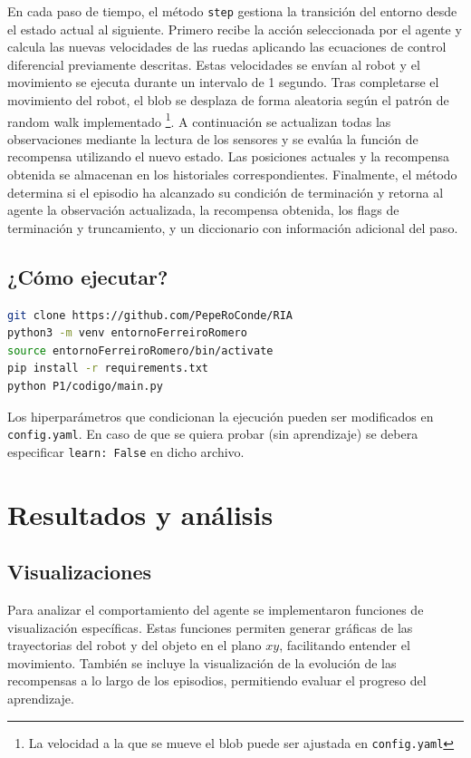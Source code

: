 \documentclass[12pt,a4paper]{article}
\begin{document}
En cada paso de tiempo, el método \texttt{step} gestiona la transición del
entorno desde el estado actual al siguiente. Primero recibe la acción
seleccionada por el agente y calcula las nuevas velocidades de las ruedas
aplicando las ecuaciones de control diferencial previamente descritas. Estas
velocidades se envían al robot y el movimiento se ejecuta durante un intervalo
de 1 segundo. Tras completarse el movimiento del robot, el blob se desplaza de
forma aleatoria según el patrón de random walk implementado \footnote{La velocidad a la que se mueve el blob puede ser ajustada en \texttt{config.yaml}}. A continuación se
actualizan todas las observaciones mediante la lectura de los sensores y se
evalúa la función de recompensa utilizando el nuevo estado. Las posiciones
actuales y la recompensa obtenida se almacenan en los historiales
correspondientes. Finalmente, el método determina si el episodio ha alcanzado su
condición de terminación y retorna al agente la observación actualizada, la
recompensa obtenida, los flags de terminación y truncamiento, y un diccionario
con información adicional del paso.

\subsection{¿Cómo ejecutar?}
\label{subsec:como}


\begin{lstlisting}[language=bash]
git clone https://github.com/PepeRoConde/RIA
python3 -m venv entornoFerreiroRomero
source entornoFerreiroRomero/bin/activate
pip install -r requirements.txt
python P1/codigo/main.py
\end{lstlisting}

Los hiperparámetros que condicionan la ejecución pueden ser modificados en \texttt{config.yaml}. En caso de que se quiera probar (sin aprendizaje) se debera especificar \texttt{learn: False} en dicho archivo.   

\section{Resultados y análisis}

\subsection{Visualizaciones}

Para analizar el comportamiento del agente se implementaron funciones de
visualización específicas. Estas funciones permiten generar gráficas de las
trayectorias del robot y del objeto en el plano $xy$, facilitando entender el
movimiento. También se incluye la visualización de la evolución de las
recompensas a lo largo de los episodios, permitiendo evaluar el progreso del
aprendizaje. 
\end{document}
